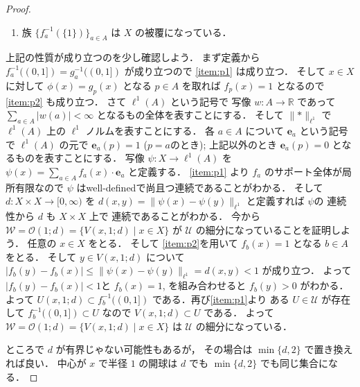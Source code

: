 \documentclass[leqno, a4paper, 12pt]{jsarticle}
\numberwithin{equation}{section}
\newcommand{\rr}{\mathbb{R}}
\newcommand{\yocovfont}[1]{\mathscr{#1}}
\newcommand{\yoellsp}[1]{\ell^{1}(#1)}
\newcommand{\yoelldis}[1]{\lVert #1\rVert_{\ell^{1}}}
\newcommand{\yobasis}{\mathbf{e}}
\newcommand{\yoball}[3]{V(#1, #2; #3)}
\newcommand{\yoballfam}[2]{\yocovfont{O}(#1; #2)}
\begin{document}
\begin{proof}
\begin{enumerate}[label=\textup{(A\arabic*)}]
\item\label{item:p2}
族
$\{f_{a}^{-1}(\{1\})\}_{a\in A}$
は
$X$
の被覆になっている．
 \end{enumerate}
上記の性質が成り立つのを少し確認しよう．
まず定義から
$f_{a}^{-1}((0, 1])=g_{a}^{-1}((0, 1])$
が成り立つので
\ref{item:p1}
は成り立つ．
そして
$x\in X$
に対して
$\phi(x)=g_{p}(x)$
となる
$p\in A$
を取れば
$f_{p}(x)=1$
となるので
\ref{item:p2}
も成り立つ．
さて
$\yoellsp{A}$
という記号で
写像
$w\colon A\to \rr$
であって
 $\sum_{a\in A}|w(a)|<\infty$
 となるもの全体を表すことにする．
 そして
 $\yoelldis{*}$
 で
 $\yoellsp{A}$
 上の
 $\ell^{1}$
 ノルムを表すことにする．
各
$a\in A$
について
  $\yobasis_{a}$
   という記号で
  $\yoellsp{A}$
  の元で
   $\yobasis_{a}(p)=1$
   ($p=a$のとき); 
   上記以外のとき
    $\yobasis_{a}(p)=0$
    となるものを表すことにする．
    写像 
    $\psi\colon X\to \yoellsp{A}$
    を
      $\psi(x)=\sum_{a\in A}f_{a}(x)\cdot \yobasis_{a}$
      と定義する．
      \ref{item:p1}
      より
      $f_{a}$
      のサポート全体が局所有限なので
      $\psi$
      はwell-definedで尚且つ連続であることがわかる．
      そして
      $d\colon X\times X\to [0, \infty)$
を
  $d(x, y)=\yoelldis{\psi(x)-\psi(y)}$
  と定義すれば
  $\psi$の
  連続性から
  $d$
  も
  $X\times X$
  上で 
  連続であることがわかる．
  今から
  $\yocovfont{W}=\yoballfam{1}{d}=\{\yoball{x}{1}{d}\mid x\in X\}$
が
$\yocovfont{U}$
の細分になっていることを証明しよう．
任意の
$x\in X$
をとる．
そして
\ref{item:p2}を用いて
$f_{b}(x)=1$
となる
$b\in A$
をとる．
そして
$y\in \yoball{x}{1}{d}$
について
 $|f_{b}(y)-f_{b}(x)|\le \yoelldis{\psi(x)-\psi(y)}=d(x, y)<1$
 が成り立つ．
 よって
 $|f_{b}(y)-f_{b}(x)|<1$と
 $f_{b}(x)=1$, 
 を組み合わせると
   $f_{b}(y)>0$
   がわかる．
   よって
   $U(x, 1; d)\subset f_{b}^{-1}((0, 1])$
   である．再び\ref{item:p1}より
   ある
   $U\in \yocovfont{U}$
   が存在して
   $f_{b}^{-1}((0, 1])\subset U$
   なので
   $\yoball{x}{1}{d}\subset U$
   である．
   よって
   $\yocovfont{W}=\yoballfam{1}{d}=\{\yoball{x}{1}{d}\mid x\in X\}$
は
$\yocovfont{U}$
の細分になっている．

ところで
$d$
が有界じゃない可能性もあるが，
その場合は
$\min\{d, 2\}$
で置き換えれば良い．
中心が
$x$
で半径
$1$
の開球は
$d$
でも
$\min\{d, 2\}$
でも同じ集合になる．
\end{proof}
\end{document}
